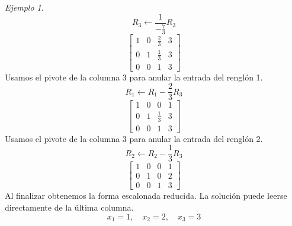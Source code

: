 \documentclass[12pt]{article}
\theoremstyle{remark}
\newtheorem{Ejem}[definicion]{Ejemplo}
\begin{document}
\begin{Ejem}
\[
R_{3}\leftarrow \frac{1}{- \frac{7}{3}}R_{3}
\]
\[
\left[\begin{array}{ccc|c}
1 & 0 & \frac{2}{3} & 3\\
0 & 1 & \frac{1}{3} & 3\\
0 & 0 & 1 & 3
\end{array}\right]
\]
Usamos el pivote de la columna 3 para anular la entrada del renglón 1.
\[
R_{1}\leftarrow R_{1}-\frac{2}{3}R_{3}
\]
\[
\left[\begin{array}{ccc|c}
1 & 0 & 0 & 1\\
0 & 1 & \frac{1}{3} & 3\\
0 & 0 & 1 & 3
\end{array}\right]
\]
Usamos el pivote de la columna 3 para anular la entrada del renglón 2.
\[
R_{2}\leftarrow R_{2}-\frac{1}{3}R_{3}
\]
\[
\left[\begin{array}{ccc|c}
1 & 0 & 0 & 1\\
0 & 1 & 0 & 2\\
0 & 0 & 1 & 3
\end{array}\right]
\]
Al finalizar obtenemos la forma escalonada reducida. La solución puede leerse directamente de la última columna.
\[
\boxed{x_{1}=1,\quad x_{2}=2,\quad x_{3}=3}
\]

\end{Ejem}
\end{document}
